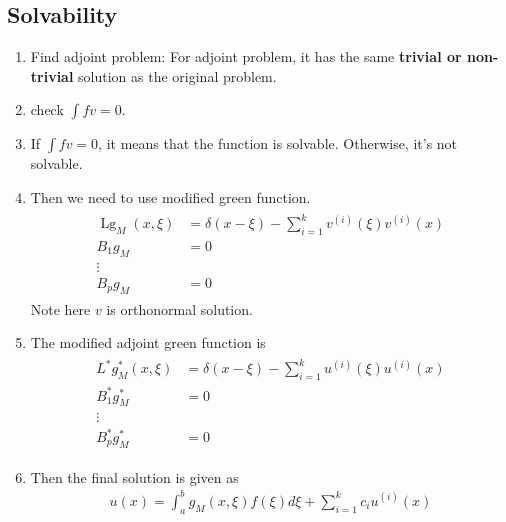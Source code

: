 \documentclass{article}
\numberwithin{equation}{section}
\newcommand{\<}{\langle}
\begin{document}
\subsection{Solvability}
\begin{enumerate}
\item Find adjoint problem: For adjoint problem, it has the same \textbf{trivial or non-trivial} solution as the original problem.
\item check $\int fv = 0$.
\item If $\int fv = 0$, it means that the function is solvable. Otherwise, it's not solvable.
\item Then we need to use modified green function.
\begin{align}
\begin{aligned} \operatorname{Lg}_{M}(x, \xi) &=\delta(x-\xi)-\sum_{i=1}^{k} v^{(i)}(\xi) v^{(i)}(x) \\ B_{1} g_{M} &=0 \\ \vdots & \\ B_{p} g_{M} &=0 \end{aligned}
\end{align}
Note here $v$ is orthonormal solution.
\item The modified adjoint green function is 
\begin{align}
\begin{aligned} L^{*} g_{M}^{*}(x, \xi) &=\delta(x-\xi)-\sum_{i=1}^{k} u^{(i)}(\xi) u^{(i)}(x) \\ B_{1}^{*} g_{M}^{*} &=0 \\ \vdots & \\ B_{p}^{*} g_{M}^{*} &=0 \end{aligned}
\end{align}
\item Then the final solution is given as
\begin{align}
u(x)=\int_{a}^{b} g_{M}(x, \xi) f(\xi) d \xi+\sum_{i=1}^{k} c_{i} u^{(i)}(x)
\end{align}
\end{enumerate}
\end{document}
